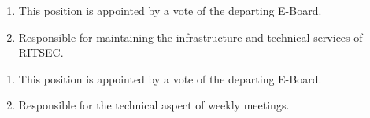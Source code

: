 
\begin{enumerate}
  \item This position is appointed by a vote of the departing E-Board.
  \item Responsible for maintaining the infrastructure and technical services
    of RITSEC.
\end{enumerate}


\begin{enumerate}
  \item This position is appointed by a vote of the departing E-Board.
  \item Responsible for the technical aspect of weekly meetings.
\end{enumerate}
